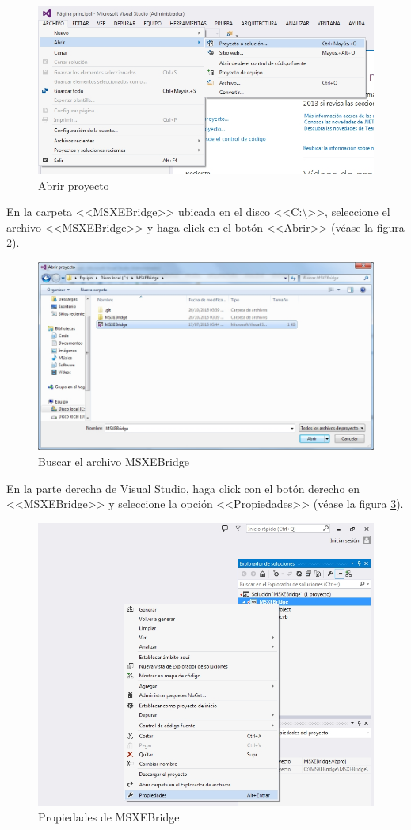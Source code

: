 \begin{figure}[H]
  \centering
  \includegraphics[width=.8\linewidth]{./img/vs-proyecto-abrir.jpg}
\caption[Abrir proyecto]{Abrir proyecto\label{fig:vs-abrir}}
\end{figure}

\newpage

En la carpeta <<MSXEBridge>> ubicada en el disco <<C:\textbackslash>>, seleccione el archivo <<MSXEBridge>> y haga click en el bot\'{o}n <<Abrir>> (v\'{e}ase la figura \ref{fig:vs-abrir-buscar}).

\begin{figure}[H]
  \centering
  \includegraphics[width=.8\linewidth]{./img/vs-abrir-buscar.jpg}
\caption[Buscar el archivo MSXEBridge]{Buscar el archivo MSXEBridge\label{fig:vs-abrir-buscar}}
\end{figure}

En la parte derecha de Visual Studio, haga click con el bot\'{o}n derecho en <<MSXEBridge>> y seleccione la opci\'{o}n <<Propiedades>> (v\'{e}ase la figura \ref{fig:vs-propiedades}).

\begin{figure}[H]
  \centering
  \includegraphics[width=.7\linewidth]{./img/vs-propiedades.jpg}
\caption[Propiedades de MSXEBridge]{Propiedades de MSXEBridge\label{fig:vs-propiedades}}
\end{figure}

